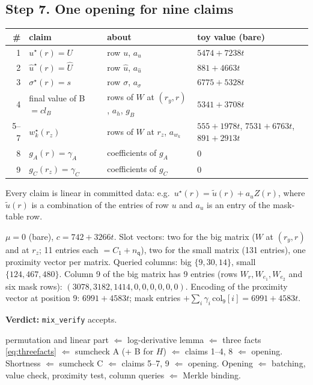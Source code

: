 \documentclass[11pt,a4paper]{article}
\newcommand{\mle}[1]{\widetilde{#1}}
\newcommand{\msk}[1]{#1^{\star}}
\newcommand{\nq}{n_{\mathsf{q}}}
\newcommand{\uh}{\hat{u}}
\theoremstyle{definition}
\theoremstyle{plain}
\begin{document}
\subsection*{Step 7. One opening for nine claims}

\begin{center}
\begin{tabular}{@{}rlll@{}}
\toprule
\# & claim & about & toy value (bare)\\\midrule
1 & $\msk u(r)=U$ & row $u$, $a_u$ & $5474{+}7238t$\\
2 & $\msk\uh(r)=\hat U$ & row $\uh$, $a_{\uh}$ & $881{+}4663t$\\
3 & $\msk\sigma(r)=s$ & row $\sigma$, $a_\sigma$ & $6775{+}5328t$\\
4 & final value of B $=\mathit{cl}_B$ & rows of $W$ at $(r_y,r)$, $a_h$, $g_B$ & $5341{+}3708t$\\
5--7 & $\msk w_k(r_z)$ & rows of $W$ at $r_z$, $a_{w_k}$ & $555{+}1978t$, $7531{+}6763t$, $891{+}2913t$\\
8 & $g_A(r)=\gamma_A$ & coefficients of $g_A$ & $0$\\
9 & $g_C(r_z)=\gamma_C$ & coefficients of $g_C$ & $0$\\
\bottomrule
\end{tabular}
\end{center}
Every claim is linear in committed data: e.g.\ $\msk u(r)=\mle u(r)+a_uZ(r)$, where $\mle u(r)$ is a
combination of the entries of row $u$ and $a_u$ is an entry of the mask-table row.

\begin{toyrun}
$\mu=0$ (bare), $c=742{+}3266t$. Slot vectors: two for the big matrix ($W$ at $(r_y,r)$ and at $r_z$; 11
entries each $=C_1+\nq$), two for the small matrix (131 entries), one proximity vector per matrix.
Queried columns: big $\{9,30,14\}$, small $\{124,467,480\}$. Column 9 of the big matrix has 9 entries
(rows $W_r,W_{e_1},W_{e_2}$ and six mask rows): $(3078,3182,1414,0,0,0,0,0,0)$. Encoding of the proximity
vector at position 9: $6991{+}4583t$; mask entries $+\sum_i\gamma_i\,\mathrm{col}_9[i]=6991{+}4583t$. \checkmark

\textbf{Verdict:} \texttt{mix\_verify} accepts.
\end{toyrun}

\begin{recap}
permutation and linear part $\Leftarrow$ log-derivative lemma $\Leftarrow$ three facts \eqref{eq:threefacts}
$\Leftarrow$ sumcheck A (+ B for $H$) $\Leftarrow$ claims 1--4, 8 $\Leftarrow$ opening.
Shortness $\Leftarrow$ sumcheck C $\Leftarrow$ claims 5--7, 9 $\Leftarrow$ opening.
Opening $\Leftarrow$ batching, value check, proximity test, column queries $\Leftarrow$ Merkle binding.
\end{recap}
\end{document}
